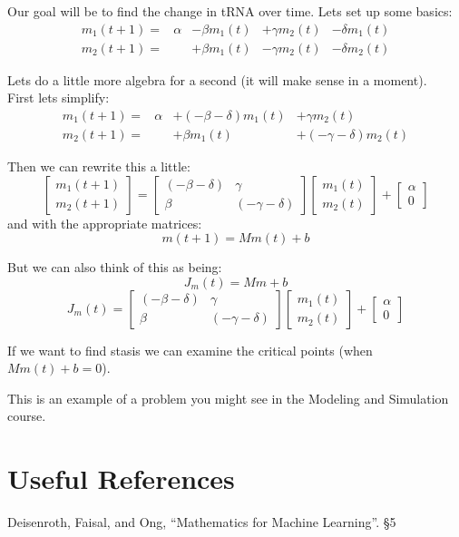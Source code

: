 Our goal will be to find the change in tRNA over time. 
Lets set up some basics:
\[\begin{array}{rrrrr}
m_1(t+1) =&\alpha &- \beta m_1(t)& + \gamma m_2(t)& - \delta m_1(t)\\
m_2(t+1) = & &+ \beta m_1(t) &- \gamma m_2(t)& - \delta m_2(t)
\end{array}\]

Lets do a little more algebra for a second (it will make sense in a moment). \\
First lets simplify: 
\[\begin{array}{rrrrr}
m_1(t+1) =&\alpha &+(- \beta-\delta) m_1(t)& + \gamma m_2(t)\\
m_2(t+1) = & &+ \beta m_1(t) & +(-\gamma- \delta) m_2(t)
\end{array}\]

Then we can rewrite this a little:
\[
\begin{bmatrix}m_1(t+1)\\m_2(t+1)\end{bmatrix} = 
\begin{bmatrix} (- \beta-\delta) & \gamma\\ \beta& (-\gamma- \delta)\end{bmatrix}
\begin{bmatrix}m_1(t)\\m_2(t)\end{bmatrix} +
\begin{bmatrix}\alpha\\0\end{bmatrix}
\]
and with the appropriate matrices:
\[m(t+1)=Mm(t)+b\]

But we can also think of this as being: 
\[J_m(t) = Mm+b\]
\[
J_m(t) = 
\begin{bmatrix} (- \beta-\delta) & \gamma\\ \beta& (-\gamma- \delta)\end{bmatrix}
\begin{bmatrix}m_1(t)\\m_2(t)\end{bmatrix} +
\begin{bmatrix}\alpha\\0\end{bmatrix}
\]

If we want to find stasis we can examine the critical points (when $Mm(t)+b=0$). 

This is an example of a problem you might see in the Modeling and Simulation course. 
\fi


\section*{Useful References}
Deisenroth, Faisal, and Ong, ``Mathematics for Machine Learning''. \S 5

